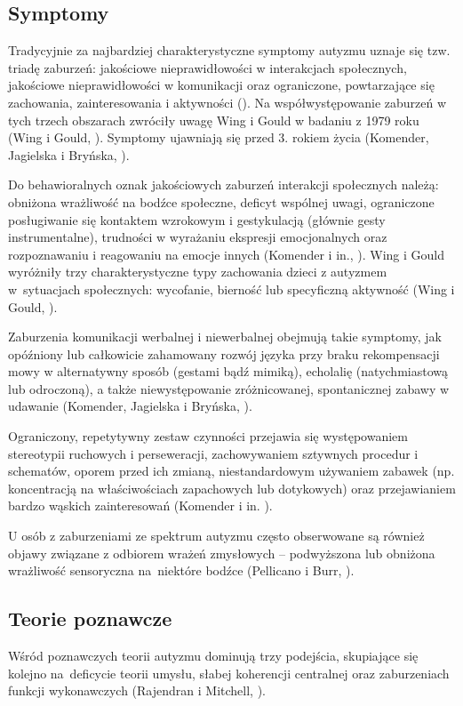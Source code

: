     \subsection{Symptomy}
    Tradycyjnie za najbardziej charakterystyczne symptomy autyzmu uznaje się tzw. triadę zaburzeń: jakościowe nieprawidłowości w interakcjach społecznych, jakościowe nieprawidłowości w komunikacji oraz ograniczone, powtarzające się zachowania, zainteresowania i aktywności (\cite{frith2008autyzm}).
    Na współwystępowanie zaburzeń w tych trzech obszarach zwróciły uwagę Wing i Gould w badaniu z 1979 roku (Wing i Gould, \cite*{wing1979severe}).
    Symptomy ujawniają się przed 3. rokiem życia (Komender, Jagielska i Bryńska, \cite*{komender2012autyzm}).
    
    Do behawioralnych oznak jakościowych zaburzeń interakcji społecznych należą: obniżona wrażliwość na bodźce społeczne, deficyt wspólnej uwagi, ograniczone posługiwanie się kontaktem wzrokowym i gestykulacją (głównie gesty instrumentalne), trudności w wyrażaniu ekspresji emocjonalnych oraz rozpoznawaniu i reagowaniu na emocje innych (Komender i in., \cite*{komender2012autyzm}).
    Wing i Gould wyróżniły trzy charakterystyczne typy zachowania dzieci z autyzmem w~sytuacjach społecznych: wycofanie, bierność lub specyficzną aktywność (Wing i Gould, \cite*{wing1979severe}).
    
    Zaburzenia komunikacji werbalnej i niewerbalnej obejmują takie symptomy, jak opóźniony lub całkowicie zahamowany rozwój języka przy braku rekompensacji mowy w alternatywny sposób (gestami bądź mimiką), echolalię (natychmiastową lub odroczoną), a także niewystępowanie zróżnicowanej, spontanicznej zabawy w udawanie (Komender, Jagielska i Bryńska, \cite*{komender2012autyzm}).
    
    Ograniczony, repetytywny zestaw czynności przejawia się występowaniem stereotypii ruchowych i perseweracji, zachowywaniem sztywnych procedur i schematów, oporem przed ich zmianą, niestandardowym używaniem zabawek (np. koncentracją na właściwościach zapachowych lub dotykowych) oraz przejawianiem bardzo wąskich zainteresowań (Komender i in. \cite*{komender2012autyzm}).
    
    U osób z zaburzeniami ze spektrum autyzmu często obserwowane są również objawy związane z odbiorem wrażeń zmysłowych -- podwyższona lub obniżona wrażliwość sensoryczna na~niektóre bodźce (Pellicano i Burr, \cite*{pellicano2012world}).
    
    \subsection{Teorie poznawcze}
    Wśród poznawczych teorii autyzmu dominują trzy podejścia, skupiające się kolejno na~deficycie teorii umysłu, słabej koherencji centralnej oraz zaburzeniach funkcji wykonawczych (Rajendran i Mitchell, \cite*{rajendran2007cognitive}).
    

